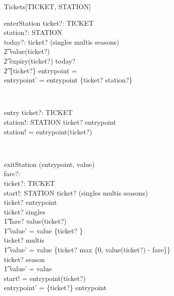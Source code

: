 \begin{class}{Tickets}[TICKET, STATION]
\begin{schema}{enterStation}
ticket?: TICKET \\ 
station?: STATION \\ 
today?:  \nat  
\where
 ticket? \in (singles \cup multis \cup seasons) \land \\ 
\t2 value(ticket?)  \land \\ 
\t2 expiry(ticket?) \geq today? \land \\ 
\t2 \{ticket?\} \dres entrypoint = \emptyset \\ 
entrypoint' = entrypoint \cup \{ticket? \mapsto station?\} \\ 
\end{schema} \\ 
\begin{schema}{entry}
ticket?: TICKET \\ 
station!: STATION 
\where
 ticket? \in  \dom entrypoint \\ 
station! = entrypoint(ticket?) \\ 
\end{schema} \\ 
\begin{schema}{exitStation}
\Delta (entrypoint, value)\\
fare?:  \nat  \\ 
ticket?: TICKET \\ 
start!: STATION 
\where
 ticket? \in (singles \cup multis \cup seasons) \land \\ 
ticket? \in  \dom entrypoint \\ 
ticket? \in singles \implies\\
\t1 fare? \leq value(ticket?) \land \\ 
\t1 value' = value \oplus \{ticket? \}\\
ticket? \in multis \implies\\ 
\t1 value' = value \oplus \{ticket? \mapsto max \{0, value(ticket?) - fare\}\}\\ 
ticket? \in season \implies\\
\t1 value' = value\\
start! = entrypoint(ticket?) \\ 
entrypoint' = \{ticket?\} \ndres entrypoint
\end{schema} 
\end{class} 
